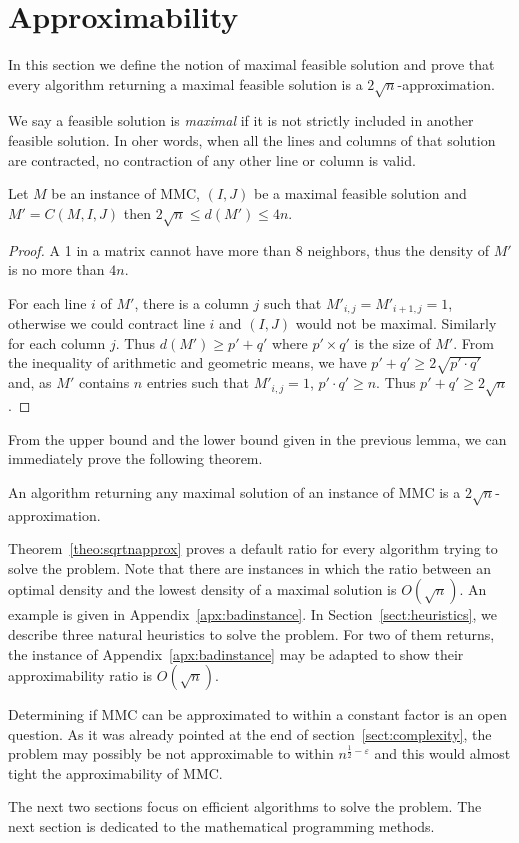 \section{Approximability}
\label{sect:approx}

In this section we define the notion of maximal feasible solution and prove that every algorithm returning a maximal feasible solution is a $2\sqrt{n}$-approximation.

\begin{definition}
We say a feasible solution is \emph{maximal} if it is not strictly included in another feasible solution. In oher words, when all the lines and columns of that solution are contracted, no contraction of any other line or column is valid.
\end{definition}

\begin{lemma}
\label{lem:bounds}
Let $M$ be an instance of MMC, $(I,J)$ be a maximal feasible solution and $M' = C(M,I,J)$ then $2 \sqrt{n} \leq d(M') \leq 4n$.
\end{lemma}
\begin{proof}
A 1 in a matrix cannot have more than $8$ neighbors, thus the density of $M'$ is no more than $4n$.

For each line $i$ of $M'$, there is a column $j$ such that $M'_{i,j} = M'_{i+1,j} = 1$, otherwise we could contract line $i$ and $(I,J)$ would not be maximal. Similarly for each column $j$. Thus $d(M') \geq p'+q'$ where $p' \times q'$ is the size of $M'$. From the inequality of arithmetic and geometric means, we have $p' + q ' \geq 2 \sqrt{p'\cdot q'}$ and, as $M'$ contains $n$ entries such that $M'_{i,j} = 1$, $p'\cdot q' \geq n$. Thus $p' + q ' \geq 2 \sqrt{n}$.
\end{proof}

From the upper bound and the lower bound given in the previous lemma, we can immediately prove the following theorem. 

\begin{theorem}
	\label{theo:sqrtnapprox}
An algorithm returning any maximal solution of an instance of MMC is a $2\sqrt{n}$-approximation.
\end{theorem}

Theorem~\ref{theo:sqrtnapprox} proves a default ratio for every algorithm trying to solve the problem. Note that there are instances in which the ratio between an optimal density and the lowest density of a maximal solution is $O(\sqrt{n})$. An example is given in Appendix~\ref{apx:badinstance}. In Section~\ref{sect:heuristics}, we describe three natural heuristics to solve the problem. For two of them returns, the instance of Appendix~\ref{apx:badinstance} may be adapted to show their approximability ratio is $O(\sqrt{n})$. 

Determining if MMC can be approximated to within a constant factor is an open question. As it was already pointed at the end of section~\ref{sect:complexity}, the problem may possibly be not approximable to within $n^{\frac{1}{2}-\varepsilon}$ and this would almost tight the approximability of MMC.

The next two sections focus on efficient algorithms to solve the problem. The next section is dedicated to the mathematical programming methods.